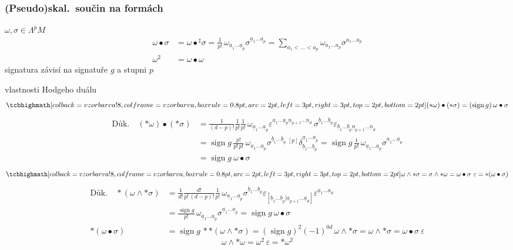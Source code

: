 \subsubsection*{(Pseudo)skal.\ součin na formách} 
$\omega,\sigma\in\Lambda^pM$
\begin{align*}
  \omega\bullet\sigma &= \omega\bullet{}^\sharp\sigma = \frac{1}{p!}\,\omega_{\underline{a}_1\dots\underline{a}_p}\sigma^{\underline{a}_1\dots\underline{a}_p} = \sum_{a_1<\dots<a_p}\omega_{a_1\dots a_p}\sigma^{a_1\dots a_p} \\
  \omega^2 &= \omega\bullet\omega
\end{align*}
\quad signatura závisí na signatuře $g$ a stupni $p$

vlastnosti Hodgeho duálu
\[
  \vzorec{(*\omega)\bullet(*\sigma) = (\operatorname{sign}g)\,\omega\bullet\sigma}
\]
\begin{align*}
  \text{Důk.}\quad (*\omega)\bullet(*\sigma) &= \frac{1}{(d-p)!}\frac{1}{p!}\frac{1}{p!}\,\omega_{\underline{a}_1\dots\underline{a}_p}\varepsilon^{\underline{a}_1\dots\underline{a}_p\underline{n}_{p+1}\dots\underline{n}_d}\,\sigma^{\underline{b}_1\dots\underline{b}_p}\varepsilon_{\underline{b}_1\dots\underline{b}_p\underline{n}_{p+1}\dots\underline{n}_d} \\
  &= \operatorname{sign}g\,\frac{p!}{p!\,p!}\,\omega_{\underline{a}_1\dots\underline{a}_p}\sigma^{\underline{b}_1\dots\underline{b}_p}\,{}^{[p]}\delta^{\underline{a}_1\dots\underline{a}_p}_{\underline{b}_1\dots\underline{b}_p}
   = \operatorname{sign}g\,\frac{1}{p!}\,\omega_{\underline{a}_1\dots\underline{a}_p}\sigma^{\underline{a}_1\dots\underline{a}_p} \\
  &= \operatorname{sign}g\ \omega\bullet\sigma
\end{align*}
\[
  \vzorec{\omega\wedge*\sigma = \sigma\wedge*\omega = \omega\bullet\sigma\ \varepsilon = *(\omega\bullet\sigma)}
\]
\begin{align*}
  \text{Důk.}\quad *(\omega\wedge*\sigma) &= \frac{1}{d!}\frac{d!}{p!\,(d-p)!}\frac{1}{p!}\,\omega_{\underline{a}_1\dots\underline{a}_p}\sigma^{\underline{b}_1\dots\underline{b}_p}\varepsilon_{[\underline{b}_1\dots\underline{b}_p|\underline{a}_{p+1}\dots\underline{a}_d]}\varepsilon^{\underline{a}_1\dots\underline{a}_d} \\
  &= \frac{\operatorname{sign}g}{p!}\,\omega_{\underline{a}_1\dots\underline{a}_p}\sigma^{\underline{a}_1\dots\underline{a}_p} = \operatorname{sign}g\ \omega\bullet\sigma \\
  *(\omega\bullet\sigma) &= \operatorname{sign}g\,**(\omega\wedge*\sigma) = (\operatorname{sign}g)^2(-1)^{0d}\,\omega\wedge*\sigma = \omega\wedge*\sigma = \omega\bullet\sigma\ \varepsilon
\end{align*}
\[
  \omega\wedge*\omega = \omega^2\,\varepsilon = *\omega^2
\]

